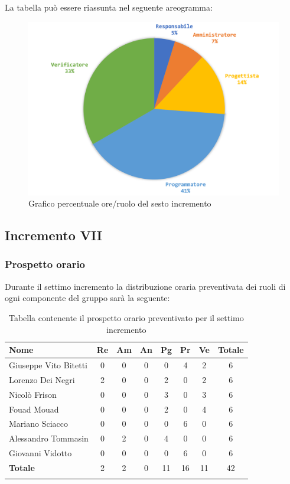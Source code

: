		La tabella può essere riassunta nel seguente areogramma:
		\begin{figure}[H]
			\centering
			\includegraphics[width=0.8\linewidth]{./images/preventivo/incremento6-2.png}
			\caption{Grafico percentuale ore/ruolo del sesto incremento}
			\label{fig:grafico costi ruolo incremento VI}
		\end{figure}
		
		
		
		\subsection{Incremento VII}
		\subsubsection{Prospetto orario}
		Durante il settimo incremento la distribuzione oraria preventivata dei ruoli di ogni componente del gruppo sarà la seguente:
		
		\begin{longtable}{|l|c|c|c|c|c|c|c|}
			\hline
			\rowcolor{lighter-grayer}
			\textbf{Nome} & \textbf{Re} & \textbf{Am} & \textbf{An} & \textbf{Pg}  & \textbf{Pr}   & \textbf{Ve} & \textbf{Totale} \\
			\hline
			\endfirsthead
			
			\hline
			Giuseppe Vito Bitetti 		 & 0 & 0 & 0 & 0 & 4 & 2 & 6\\
			\hline
			\hline
			Lorenzo Dei Negri			 & 2 & 0 & 0 & 2 & 0 & 2 & 6\\
			\hline
			\hline
			Nicolò Frison				      & 0 & 0 & 0 & 3 & 0 & 3 & 6\\
			\hline
			\hline
			Fouad Mouad 				   & 0 & 0 & 0 & 2 & 0 & 4 & 6\\
			\hline
			\hline
			Mariano Sciacco 			 & 0 & 0 & 0 & 0 & 6 & 0 & 6\\
			\hline
			\hline
			Alessandro Tommasin    & 0 & 2 & 0 & 4 & 0 & 0 & 6\\
			\hline
			\hline
			Giovanni Vidotto 			  & 0 & 0 & 0 & 0 & 6 & 0 & 6\\
			\hline 
			\textbf{Totale}			 		& 2 & 2 & 0 & 11 & 16 & 11 & 42\\
			\hline
			\caption{Tabella contenente il prospetto orario preventivato per il settimo incremento}
		\end{longtable}
		\pagebreak
		
